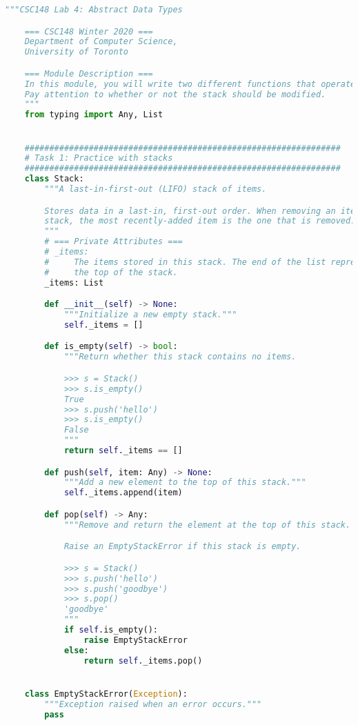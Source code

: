 \documentclass[12pt]{article}
\begin{document}
\begin{lstlisting}[language=Python,caption={mystack.py},captionpos=b]
    """CSC148 Lab 4: Abstract Data Types

    === CSC148 Winter 2020 ===
    Department of Computer Science,
    University of Toronto

    === Module Description ===
    In this module, you will write two different functions that operate on a Stack.
    Pay attention to whether or not the stack should be modified.
    """
    from typing import Any, List


    ################################################################
    # Task 1: Practice with stacks
    ################################################################
    class Stack:
        """A last-in-first-out (LIFO) stack of items.

        Stores data in a last-in, first-out order. When removing an item from the
        stack, the most recently-added item is the one that is removed.
        """
        # === Private Attributes ===
        # _items:
        #     The items stored in this stack. The end of the list represents
        #     the top of the stack.
        _items: List

        def __init__(self) -> None:
            """Initialize a new empty stack."""
            self._items = []

        def is_empty(self) -> bool:
            """Return whether this stack contains no items.

            >>> s = Stack()
            >>> s.is_empty()
            True
            >>> s.push('hello')
            >>> s.is_empty()
            False
            """
            return self._items == []

        def push(self, item: Any) -> None:
            """Add a new element to the top of this stack."""
            self._items.append(item)

        def pop(self) -> Any:
            """Remove and return the element at the top of this stack.

            Raise an EmptyStackError if this stack is empty.

            >>> s = Stack()
            >>> s.push('hello')
            >>> s.push('goodbye')
            >>> s.pop()
            'goodbye'
            """
            if self.is_empty():
                raise EmptyStackError
            else:
                return self._items.pop()


    class EmptyStackError(Exception):
        """Exception raised when an error occurs."""
        pass



\end{lstlisting}
\end{document}
